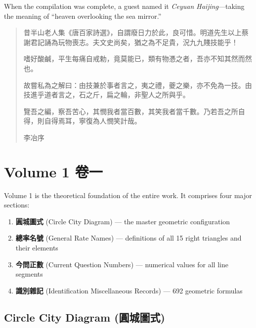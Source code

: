 \documentclass[11pt,a4paper]{article}
\begin{document}
When the compilation was complete, a guest named it \textit{Ceyuan Haijing}---taking the meaning of ``heaven overlooking the sea mirror.''

\vspace{0.5cm}

{\color{prefacecolor}
\begin{quote}
昔半山老人集《唐百家詩選》，自謂廢日力於此，良可惜。明道先生以上蔡謝君記誦為玩物喪志。夫文史尚矣，猶之為不足貴，況九九賤技能乎！

嗜好酸鹹，平生每痛自戒勅，竟莫能已，類有物慿之者，吾亦不知其然而然也。

故嘗私為之解曰：由技兼於事者言之，夷之禮，夔之樂，亦不免為一技。由技進乎道者言之，石之斤，扁之輪，非聖人之所與乎。

覽吾之編，察吾苦心，其憫我者當百數，其笑我者當千數。乃若吾之所自得，則自得焉耳，寧復為人憫笑計哉。

\hfill 李冶序
\end{quote}
}

\newpage

\section{Volume 1 \quad 卷一}
\label{sec:vol1}

Volume 1 is the theoretical foundation of the entire work. It comprises four major sections:

\begin{enumerate}[leftmargin=2em]
  \item \textbf{圓城圖式} (Circle City Diagram) --- the master geometric configuration
  \item \textbf{總率名號} (General Rate Names) --- definitions of all 15 right triangles and their elements
  \item \textbf{今問正數} (Current Question Numbers) --- numerical values for all line segments
  \item \textbf{識別雜記} (Identification Miscellaneous Records) --- 692 geometric formulas
\end{enumerate}

\subsection{Circle City Diagram (圓城圖式)}
\label{subsec:diagram}
\end{document}
